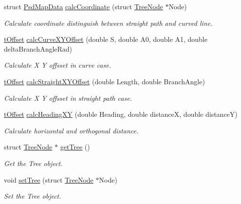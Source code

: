 \begin{DoxyCompactItemize}
struct \hyperlink{struct_psd_map_data}{Psd\+Map\+Data} \hyperlink{class_psd_map_a32a4312f48a064153216831d5b0beb41}{calc\+Coordinate} (struct \hyperlink{struct_tree_node}{Tree\+Node} $\ast$Node)
\begin{DoxyCompactList}\small\item\em Calculate coordinate distinguish between straight path and curved line. \end{DoxyCompactList}\item 
\hyperlink{_psd_message_decoder_8h_a7d8466510c49a8035fcf35b2949bea5a}{t\+Offset} \hyperlink{class_psd_map_ac7db4ce816867efd9074a54a99b7d046}{calc\+Curve\+X\+Y\+Offset} (double S, double A0, double A1, double delta\+Branch\+Angle\+Rad)
\begin{DoxyCompactList}\small\item\em Calculate X Y offsset in curve case. \end{DoxyCompactList}\item 
\hyperlink{_psd_message_decoder_8h_a7d8466510c49a8035fcf35b2949bea5a}{t\+Offset} \hyperlink{class_psd_map_a804df58155e626d0a6309fad2d7c52b9}{calc\+Straight\+X\+Y\+Offset} (double Length, double Branch\+Angle)
\begin{DoxyCompactList}\small\item\em Calculate X Y offsset in straight path case. \end{DoxyCompactList}\item 
\hyperlink{_psd_message_decoder_8h_a7d8466510c49a8035fcf35b2949bea5a}{t\+Offset} \hyperlink{class_psd_map_a2319f4363ead5ff44b847570509f2fca}{calc\+Heading\+XY} (double Heading, double distanceX, double distanceY)
\begin{DoxyCompactList}\small\item\em Calculate horizontal and orthogonal distance. \end{DoxyCompactList}\item 
struct \hyperlink{struct_tree_node}{Tree\+Node} $\ast$ \hyperlink{class_psd_map_a69a64b755dbacc77737bf6e05686c001}{get\+Tree} ()
\begin{DoxyCompactList}\small\item\em Get the Tree object. \end{DoxyCompactList}\item 
void \hyperlink{class_psd_map_a56643c65f1e5d4af827259354572d57a}{set\+Tree} (struct \hyperlink{struct_tree_node}{Tree\+Node} $\ast$Node)
\begin{DoxyCompactList}\small\item\em Set the Tree object. \end{DoxyCompactList}\item 

\end{DoxyCompactItemize}
